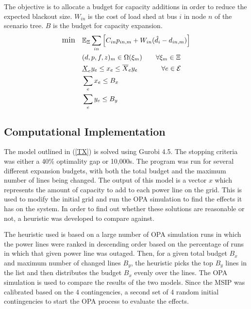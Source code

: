 The objective is to allocate a budget for capacity additions in order to reduce the expected blackout size.  $W_{in}$ is the cost of load shed at bus $i$ in node $n$ of the scenario tree.  $B$ is the budget for capacity expansion.
\begin{subequations}

\begin{align} \displaystyle
	{\large \mbox{min}} \hspace{10px} &  \Expect_\Xi \sum_{in} \left[ C_{in}  p_{in,m}  + W_{in} (\hat{d}_{i} - d_{in,m}) \right]	\\
	&(d,p,f,z)_m  \in \Omega(\xi_m)    \hspace{20px}   \forall \xi_m \in \Xi	\\
	& \underline{X}_e y_e \le x_e \le \overline{X}_e y_e \hspace{35px} \forall e \in \cE\\
	&\sum_e x_e \le B_x 	\\
	& \sum_e y_e \le B_y  
\end{align}
\label{TX}
\end{subequations}



\subsection{Computational Implementation}
The model outlined in (\ref{TX}) is solved using Gurobi 4.5.  The stopping criteria was either a 40\% optimality gap or 10,000s.  The program was run for several different expansion budgets, with both the total budget and the maximum number of lines being changed.  The output of this model is a vector $x$ which represents the amount of capacity to add to each power line on the grid.  This is used to modify the initial grid and run the OPA simulation to find the effects it has on the system.  In order to find out whether these solutions are reasonable or not, a heuristic was developed to compare against.

The heuristic used is based on a large number of OPA simulation runs in which the power lines were ranked in descending order based on the percentage of runs in which that given power line was outaged.  Then, for a given total budget $B_x$ and maximum number of changed lines $B_y$, the heuristic picks the top $B_y$ lines in the list and then distributes the budget $B_x$ evenly over the lines.  The OPA simulation is used to compare the results of the two models.  Since the MSIP was calibrated based on the 4 contingencies, a second set of 4 random initial contingencies to start the OPA process to evaluate the effects.




